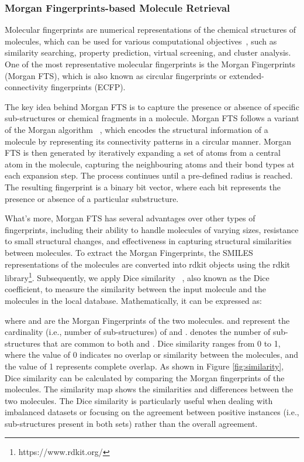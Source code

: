 \documentclass{article}
\theoremstyle{plain}
\theoremstyle{definition}
\theoremstyle{remark}
\begin{document}
\subsubsection{Morgan Fingerprints-based Molecule Retrieval}
Molecular fingerprints are numerical representations of the chemical structures of molecules, which can be used for various computational objectives~\cite{butina1999unsupervised}, such as similarity searching, property prediction, virtual screening, and cluster analysis.
One of the most representative molecular fingerprints is the Morgan Fingerprints (Morgan FTS), which is also known as circular fingerprints or extended-connectivity fingerprints (ECFP). 

The key idea behind Morgan FTS is to capture the presence or absence of specific sub-structures or chemical fragments in a molecule. Morgan FTS follows a variant of the Morgan algorithm ~\cite{butina1999unsupervised}, which encodes the structural information of a molecule by representing its connectivity patterns in a circular manner. Morgan FTS is then generated by iteratively expanding a set of atoms from a central atom in the molecule, capturing the neighbouring atoms and their bond types at each expansion step. The process continues until a pre-defined radius is reached. The resulting fingerprint is a binary bit vector, where each bit represents the presence or absence of a particular substructure.

What's more, Morgan FTS has several advantages over other types of fingerprints, including their ability to handle molecules of varying sizes, resistance to small structural changes, and effectiveness in capturing structural similarities between molecules.
To extract the Morgan Fingerprints, the SMILES representations of the molecules are converted into rdkit objects using the rdkit library\footnote{https://www.rdkit.org/}. 
Subsequently, we apply Dice similarity ~\cite{dice1945measures}, also known as the Dice coefficient, to measure the similarity between the input molecule and the molecules in the local database. Mathematically, it can be expressed as:

where  and  are the Morgan Fingerprints of the two molecules.  and  represent the cardinality (i.e., number of sub-structures) of  and .  denotes the number of sub-structures that are common to both  and . Dice similarity ranges from 0 to 1, where the value of 0 indicates no overlap or similarity between the molecules, and the value of 1 represents complete overlap.
As shown in Figure \ref{fig:similarity}, Dice similarity can be calculated by comparing the Morgan fingerprints of the molecules. The similarity map shows the similarities and differences between the two molecules.
The Dice similarity is particularly useful when dealing with imbalanced datasets or focusing on the agreement between positive instances (i.e., sub-structures present in both sets) rather than the overall agreement. 
\end{document}
